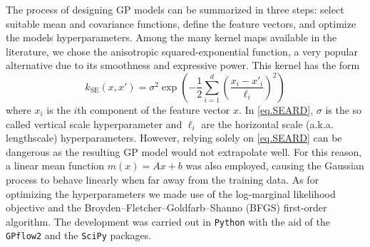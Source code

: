 The process of designing GP models can be summarized in three steps: select suitable mean and covariance functions, define the feature vectors, and optimize the models hyperparameters. Among the many kernel maps available in the literature, we chose the anisotropic squared-exponential function, a very popular alternative due to its smoothness and expressive power. This kernel has the form
\begin{equation}
	k_{\text{SE}}(x,x') = \sigma^2 \exp \left(-\frac{1}{2} \sum_{i=1}^d \left(\frac{x_i - x'_i}{\ell_i}\right)^2\right)
	\label{eq.SEARD}
\end{equation}
where $x_i$ is the $i$th component of the feature vector $x$. In \eqref{eq.SEARD}, $\sigma$ is the so called vertical scale hyperparameter and $\ell_i$ are the horizontal scale (a.k.a. lengthscale) hyperparameters. However, relying solely on \eqref{eq.SEARD} can be dangerous as the resulting GP model would not extrapolate well. For this reason, a linear mean function $m(x) = Ax + b$ was also employed, causing the Gaussian process to behave linearly when far away from the training data. As for optimizing the hyperparameters we made use of the log-marginal likelihood objective and the Broyden–Fletcher–Goldfarb–Shanno (BFGS) first-order algorithm. The development was carried out in \texttt{Python} with the aid of the \texttt{GPflow2} \citep{matthews2017gpflow} and the \texttt{SciPy} \citep{virtanen2020scipy} packages.

